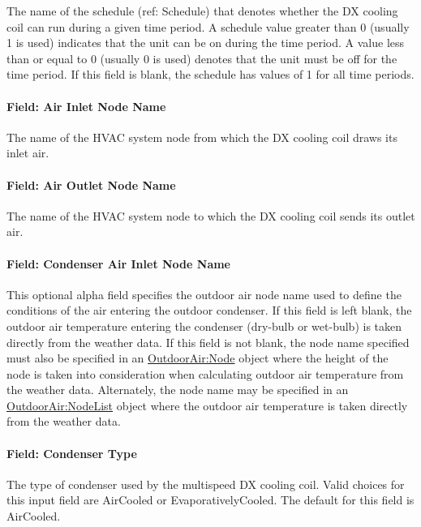 The name of the schedule (ref: Schedule) that denotes whether the DX cooling coil can run during a given time period. A schedule value greater than 0 (usually 1 is used) indicates that the unit can be on during the time period. A value less than or equal to 0 (usually 0 is used) denotes that the unit must be off for the time period. If this field is blank, the schedule has values of 1 for all time periods.

\paragraph{Field: Air Inlet Node Name}\label{field-air-inlet-node-name-11}

The name of the HVAC system node from which the DX cooling coil draws its inlet air.

\paragraph{Field: Air Outlet Node Name}\label{field-air-outlet-node-name-11}

The name of the HVAC system node to which the DX cooling coil sends its outlet air.

\paragraph{Field: Condenser Air Inlet Node Name}\label{field-condenser-air-inlet-node-name-2}

This optional alpha field specifies the outdoor air node name used to define the conditions of the air entering the outdoor condenser. If this field is left blank, the outdoor air temperature entering the condenser (dry-bulb or wet-bulb) is taken directly from the weather data. If this field is not blank, the node name specified must also be specified in an \hyperref[outdoorairnode]{OutdoorAir:Node} object where the height of the node is taken into consideration when calculating outdoor air temperature from the weather data. Alternately, the node name may be specified in an \hyperref[outdoorairnodelist]{OutdoorAir:NodeList} object where the outdoor air temperature is taken directly from the weather data.

\paragraph{Field: Condenser Type}\label{field-condenser-type-2}

The type of condenser used by the multispeed DX cooling coil. Valid choices for this input field are AirCooled or EvaporativelyCooled. The default for this field is AirCooled.

